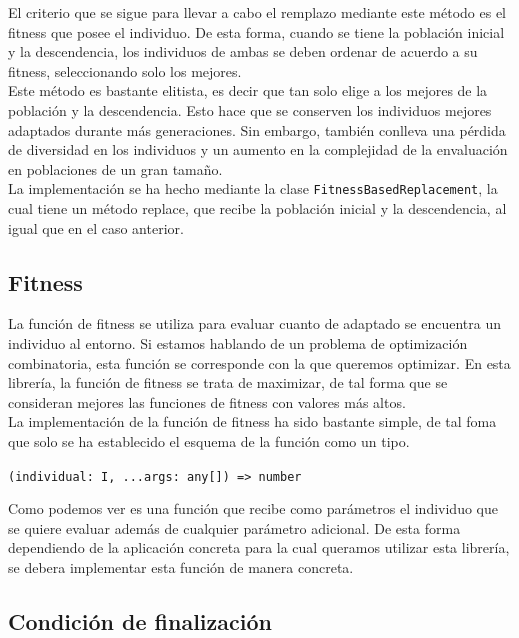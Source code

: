 El criterio que se sigue para llevar a cabo el remplazo mediante este método es el fitness que posee el individuo. De esta forma, cuando se tiene la población inicial y la descendencia, los individuos de ambas se deben ordenar de acuerdo a su fitness, seleccionando solo los mejores. \\

Este método es bastante elitista, es decir que tan solo elige a los mejores de la población y la descendencia. Esto hace que se conserven los individuos mejores adaptados durante más generaciones. Sin embargo, también conlleva una pérdida de diversidad en los individuos y un aumento en la complejidad de la envaluación en poblaciones de un gran tamaño. \\

La implementación se ha hecho mediante la clase \texttt{FitnessBasedReplacement}, la cual tiene un método replace, que recibe la población inicial y la descendencia, al igual que en el caso anterior.

\subsection{Fitness}

La función de fitness se utiliza para evaluar cuanto de adaptado se encuentra un individuo al entorno. Si estamos hablando de un problema de optimización combinatoria, esta función se corresponde con la que queremos optimizar. En esta librería, la función de fitness se trata de maximizar, de tal forma que se consideran mejores las funciones de fitness con valores más altos.\\

La implementación de la función de fitness ha sido bastante simple, de tal foma que solo se ha establecido el esquema de la función como un tipo.

\begin{center}
    \texttt{(individual: I, ...args: any[]) => number}
\end{center}

Como podemos ver es una función que recibe como parámetros el individuo que se quiere evaluar además de cualquier parámetro adicional. De esta forma dependiendo de la aplicación concreta para la cual queramos utilizar esta librería, se debera implementar esta función de manera concreta.

\subsection{Condición de finalización}

